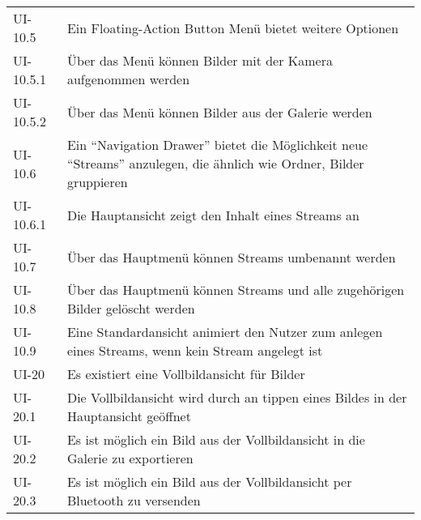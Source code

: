 \begin{center}
\begin{longtable}{|l|p{12cm}|}
UI-10.5 &  Ein Floating-Action Button Menü bietet weitere Optionen\\
UI-10.5.1 &  Über das Menü können Bilder mit der Kamera aufgenommen werden\\
UI-10.5.2 &  Über das Menü können Bilder aus der Galerie werden\\
UI-10.6 & Ein \enquote{Navigation Drawer} bietet die Möglichkeit neue \enquote{Streams} anzulegen, die ähnlich wie Ordner, Bilder gruppieren\\
UI-10.6.1 & Die Hauptansicht zeigt den Inhalt eines Streams an\\
UI-10.7 & Über das Hauptmenü können Streams umbenannt werden\\
UI-10.8 & Über das Hauptmenü können Streams und alle zugehörigen Bilder gelöscht werden\\
UI-10.9 & Eine Standardansicht animiert den Nutzer zum anlegen eines Streams, wenn kein Stream angelegt ist\\
\hline
UI-20 &  Es existiert eine Vollbildansicht für Bilder\\
UI-20.1 & Die Vollbildansicht wird durch an tippen eines Bildes in der Hauptansicht geöffnet\\
UI-20.2 & Es ist möglich ein Bild aus der Vollbildansicht in die Galerie zu exportieren\\
UI-20.3 & Es ist möglich ein Bild aus der Vollbildansicht per Bluetooth zu versenden\\
\hline
\end{longtable}
\end{center}


